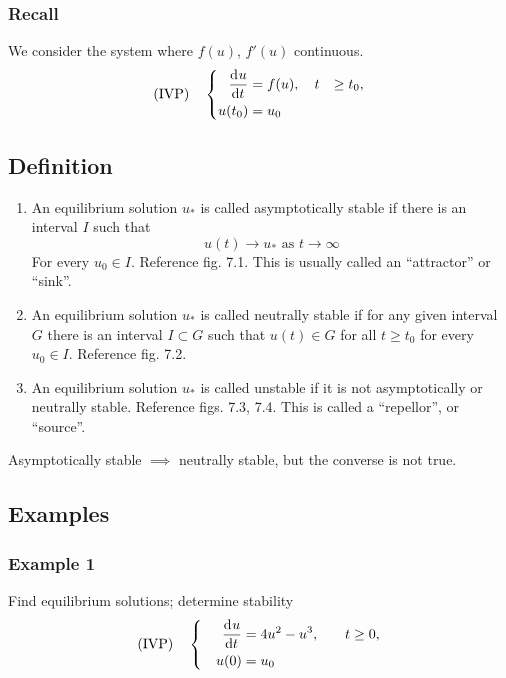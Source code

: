 \documentclass[12pt,twoside]{article}
\begin{document}
\subsubsection*{Recall}
We consider the system where $f(u)$, $f'(u)$ continuous.
\begin{equation} \text{(IVP)} \quad
  \left\{
  \begin{aligned}
    \frac{\mathrm{d}^{} {u}}{\mathrm{d}{t}^{}}&=f(u),\quad t&\ge t_0, \\
    u(t_0) &= u_0 \\
  \end{aligned} \right.
\end{equation}

\subsection{Definition}
\begin{enumerate}
\item An equilibrium solution $u_*$ is called asymptotically stable if there is
  an interval $I$ such that
  \begin{equation}
    u(t) \rightarrow u_* \text{ as } t\rightarrow\infty
  \end{equation}
  For every $u_0\in I$. Reference fig. 7.1. This is usually called an
  ``attractor'' or ``sink''.
\item An equilibrium solution $u_*$ is called neutrally stable if for any given
  interval $G$ there is an interval $I \subset G$ such that $u(t) \in G$ for all
  $t\ge t_0$ for every $u_0\in I$. Reference fig. 7.2.
\item An equilibrium solution $u_*$ is called unstable if it is not
  asymptotically or neutrally stable. Reference figs. 7.3, 7.4. This is called a
  ``repellor'', or ``source''.
\end{enumerate}

Asymptotically stable $\implies$ neutrally stable, but the converse is not true.

\subsection{Examples}
\subsubsection*{Example 1}
Find equilibrium solutions; determine stability
\begin{equation} \text{(IVP)}\quad
  \left\{
  \begin{aligned}
    \frac{\mathrm{d}^{} {u}}{\mathrm{d}{t}^{}} &= 4u^2-u^3,&\quad t&\ge0, \\ \quad u(0)&=u_0 \\
  \end{aligned} \right.
\end{equation}
\end{document}
